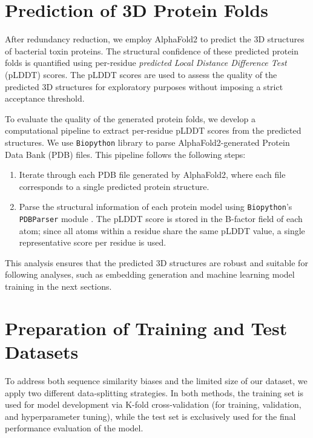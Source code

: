 \section{Prediction of 3D Protein Folds}
\label{section:protein_folds}

After redundancy reduction, we employ AlphaFold2 \cite{Jumper2021} to predict the 3D structures of bacterial toxin proteins.
The structural confidence of these predicted protein folds is quantified using per-residue \textit{predicted Local Distance Difference Test} (pLDDT) scores.
The \gls{pLDDT} scores are used to assess the quality of the predicted 3D structures for exploratory purposes without imposing a strict acceptance threshold.

To evaluate the quality of the generated protein folds, we develop a computational pipeline to extract per-residue \gls{pLDDT} scores from the predicted structures.
We use \texttt{Biopython} library \cite{cock2009biopython} to parse AlphaFold2-generated Protein Data Bank (PDB) files.
This pipeline follows the following steps:
\begin{enumerate}
	\item Iterate through each \gls{PDB} file generated by AlphaFold2, where each file corresponds to a single predicted protein structure.
	\item Parse the structural information of each protein model using \texttt{Biopython}'s \texttt{PDBParser} module \cite{Cock2009}.
	The \gls{pLDDT} score is stored in the B-factor field of each atom; since all atoms within a residue share the same pLDDT value, a single representative score per residue is used.
\end{enumerate}

This analysis ensures that the predicted 3D structures are robust and suitable for following analyses, such as embedding generation and machine learning model training in the next sections.

\section{Preparation of Training and Test Datasets}
\label{section:training_test_set}

To address both sequence similarity biases and the limited size of our dataset, we apply two different data-splitting strategies.
In both methods, the training set is used for model development via K-fold cross-validation (for training, validation, and hyperparameter tuning),
while the test set is exclusively used for the final performance evaluation of the model.


